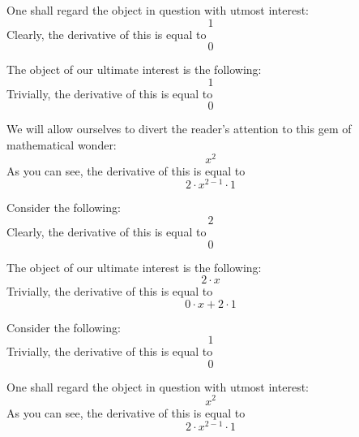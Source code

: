 \documentclass{article}
\begin{document}
One shall regard the object in question with utmost interest:
\begin{equation}
1 
\end{equation}
Clearly, the derivative of this is equal to
\begin{equation}
0 
\end{equation}

The object of our ultimate interest is the following:
\begin{equation}
1 
\end{equation}
Trivially, the derivative of this is equal to
\begin{equation}
0 
\end{equation}

We will allow ourselves to divert the reader's attention to this gem of mathematical wonder:
\begin{equation}
x ^{2 } 
\end{equation}
As you can see, the derivative of this is equal to
\begin{equation}
2 \cdot x ^{2 - 1 } \cdot 1 
\end{equation}

Consider the following:
\begin{equation}
2 
\end{equation}
Clearly, the derivative of this is equal to
\begin{equation}
0 
\end{equation}

The object of our ultimate interest is the following:
\begin{equation}
2 \cdot x 
\end{equation}
Trivially, the derivative of this is equal to
\begin{equation}
0 \cdot x + 2 \cdot 1 
\end{equation}

Consider the following:
\begin{equation}
1 
\end{equation}
Trivially, the derivative of this is equal to
\begin{equation}
0 
\end{equation}

One shall regard the object in question with utmost interest:
\begin{equation}
x ^{2 } 
\end{equation}
As you can see, the derivative of this is equal to
\begin{equation}
2 \cdot x ^{2 - 1 } \cdot 1 
\end{equation}
\end{document}
